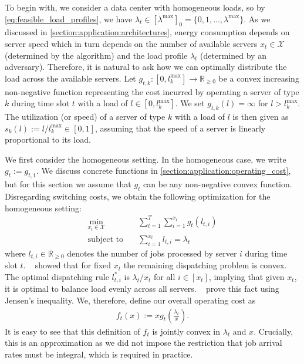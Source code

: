 To begin with, we consider a data center with homogeneous loads, so by \cref{eq:feasible_load_profiles}, we have $\lambda_t \in [\lambda^{\text{max}}]_0 = \{0, 1, \dots, \lambda^{\text{max}}\}$. As we discussed in \cref{section:application:architectures}, energy consumption depends on server speed which in turn depends on the number of available servers $x_t \in \mathcal{X}$ (determined by the algorithm) and the load profile $\lambda_t$ (determined by an adversary). Therefore, it is natural to ask how we can optimally distribute the load across the available servers. Let $g_{t,k} : [0,l_k^{\text{max}}] \to \mathbb{R}_{\geq 0}$ be a convex increasing non-negative function representing the cost incurred by operating a server of type $k$ during time slot $t$ with a load of $l \in [0,l_k^{\text{max}}]$. We set $g_{t,k}(l) = \infty$ for $l > l_k^{\text{max}}$. The utilization (or speed) of a server of type $k$ with a load of $l$ is then given as $s_k(l) := l / l_k^{\text{max}} \in [0,1]$, assuming that the speed of a server is linearly proportional to its load.

We first consider the homogeneous setting. In the homogeneous case, we write $g_t := g_{t,1}$. We discuss concrete functions in \cref{section:application:operating_cost}, but for this section we assume that $g_t$ can be any non-negative convex function. Disregarding switching costs, we obtain the following optimization for the homogeneous setting: \begin{align*}
    \min_{x_t \in \mathcal{X}} \quad &\sum_{t=1}^T \sum_{i=1}^{x_t} g_t(l_{t,i}) \\
    \text{subject to}        \quad &\sum_{i=1}^{x_t} l_{t,i} = \lambda_t
\end{align*} where $l_{t,i} \in \mathbb{R}_{\geq 0}$ denotes the number of jobs processed by server $i$ during time slot $t$. \citeauthor{Lin2011}~\cite{Lin2011} showed that for fixed $x_t$ the remaining dispatching problem is convex. The optimal dispatching rule $l_{t,i}^*$ is $\lambda_t / x_t$ for all $i \in [x_t]$, implying that given $x_t$, it is optimal to balance load evenly across all servers. \citeauthor{Albers2021_2}~\cite{Albers2021_2} prove this fact using Jensen's inequality. We, therefore, define our overall operating cost as \begin{align}\label{eq:homogeneous_load_balancing}
    f_t(x) := x g_t\left(\frac{\lambda_t}{x}\right).
\end{align} It is easy to see that this definition of $f_t$ is jointly convex in $\lambda_t$ and $x$. Crucially, this is an approximation as we did not impose the restriction that job arrival rates must be integral, which is required in practice.

